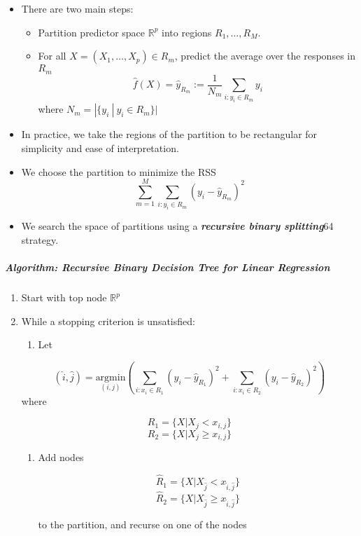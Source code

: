 \documentclass[11pt]{article}
\providecommand{\tightlist}{%
      \setlength{\itemsep}{0pt}\setlength{\parskip}{0pt}}
\begin{document}
    \begin{itemize}
\tightlist
\item
  There are two main steps:

  \begin{itemize}
  \tightlist
  \item
    Partition predictor space \(\mathbb{R}^p\) into regions
    \(R_1, \dots, R_M\).
  \item
    For all \(X = (X_1, \dots, X_p) \in R_m\), predict the average over
    the responses in \(R_m\)
    \[\hat{f}(X) = \hat{y}_{R_m} := \frac{1}{N_m}\sum_{i: y_i\in R_m} y_i\]
    where \(N_m = |\{y_i\ |\ y_i \in R_m\}|\)
  \end{itemize}
\item
  In practice, we take the regions of the partition to be rectangular
  for simplicity and ease of interpretation.
\item
  We choose the partition to minimize the RSS
  \[ \sum_{m = 1}^M \sum_{i: y_i \in R_m} (y_i - \hat{y}_{R_m})^2 \]
\item
  We search the space of partitions using a \textbf{\emph{recursive
  binary splitting}}64 strategy.
\end{itemize}

    \hypertarget{algorithm-recursive-binary-decision-tree-for-linear-regression}{%
\subparagraph{Algorithm: Recursive Binary Decision Tree for Linear
Regression}\label{algorithm-recursive-binary-decision-tree-for-linear-regression}}

    \begin{enumerate}
\def\labelenumi{\arabic{enumi}.}
\tightlist
\item
  Start with top node \(\mathbb{R}^p\)
\item
  While a stopping criterion is unsatisfied:

  \begin{enumerate}
  \def\labelenumii{\arabic{enumii}.}
  \tightlist
  \item
    Let
  \end{enumerate}

  \[(\hat{i}, \hat{j}) = \underset{(i, j)}{\text{argmin}}\left(
                                \sum_{i: x_i\in R_1} (y_i - \hat{y}_{R_1})^ 2 + 
                                \sum_{i: x_i\in R_2} (y_i - \hat{y}_{R_2})^ 2\right)\]
  where

  \[R_{1} = \{X| X_j < x_{i,j}\}\]
  \[R_{2} = \{X| X_j \geqslant x_{i,j}\}\]

  \begin{enumerate}
  \def\labelenumii{\arabic{enumii}.}
  \setcounter{enumii}{1}
  \item
    Add nodes

    \[\hat{R}_{1} = \{X| X_\hat{j} < x_{\hat{i},\hat{j}}\}\]
    \[\hat{R}_{2} = \{X| X_\hat{j} \geqslant x_{\hat{i},\hat{j}}\}\]

    to the partition, and recurse on one of the nodes
  \end{enumerate}
\end{enumerate}
\end{document}
